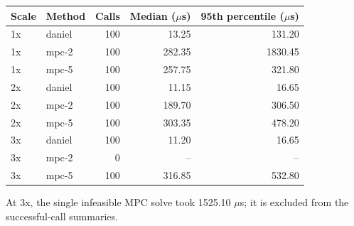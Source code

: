 \begin{tabular}{llrrr}
\toprule
Scale & Method & Calls & Median ($\mu$s) & 95th percentile ($\mu$s) \\ \midrule
1x & daniel & 100 & 13.25 & 131.20 \\ 
1x & mpc-2 & 100 & 282.35 & 1830.45 \\ 
1x & mpc-5 & 100 & 257.75 & 321.80 \\ 
2x & daniel & 100 & 11.15 & 16.65 \\ 
2x & mpc-2 & 100 & 189.70 & 306.50 \\ 
2x & mpc-5 & 100 & 303.35 & 478.20 \\ 
3x & daniel & 100 & 11.20 & 16.65 \\ 
3x & mpc-2 & 0 & -- & -- \\ 
3x & mpc-5 & 100 & 316.85 & 532.80 \\ 
\bottomrule
\end{tabular}

\par\medskip At 3x, the single infeasible MPC solve took 1525.10 $\mu$s; it is excluded from the successful-call summaries.
